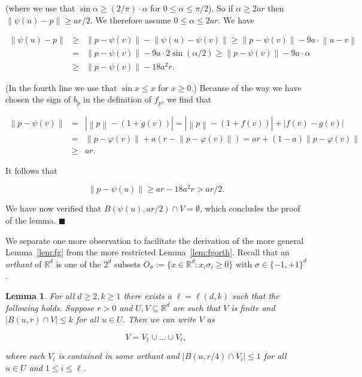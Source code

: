 \documentclass[11pt]{article}%
\newenvironment{proof}{\vspace{1ex}\noindent{\bf Proof.}}{\hspace*{\fill}$\blacksquare$\vspace{1ex}}
\newtheorem{lemma}[lemma]{Lemma}
\newcommand{\eR}[0]{\ensuremath{ \mathbb R}}
\newcommand{\norm}[1]{\ensuremath{\left\|#1\right\|}}
\begin{document}
\begin{proof}
\noindent
(where we use that $\sin\alpha \geq (2/\pi)\cdot\alpha$ for $0 \leq \alpha \leq \pi/2$).
So if $\alpha \geq 2ar$ then $\norm{\psi(u)-p} \geq ar/2$.
We therefore assume $0 \leq \alpha \leq 2ar$.
We have

$$ \begin{array}{rcl} 
\norm{\psi(u)-p} 
& \geq & 
\norm{p-\psi(v)} - \norm{\psi(u)-\psi(v)} 
\geq
\norm{p-\psi(v)} - 9a \cdot \norm{u-v} \\
& = & 
\norm{p-\psi(v)} - 9a \cdot 2\sin(\alpha/2) 
\geq
\norm{p-\psi(v)} - 9a \cdot \alpha \\
& \geq & 
\norm{p-\psi(v)} - 18 a^2 r. 
\end{array} $$

\noindent
(In the fourth line we use that $\sin x \leq x$ for $x \geq 0$.)
Because of the way we have chosen the sign of $b_p$ in the definition of $f_p$, we find that

$$ \begin{array}{rcl} 
\norm{p - \psi(v)} 
& = & |\norm{p}-(1+g(v))| = |\norm{p}-(1+f(v))|+|f(v)-g(v)| \\
& = & \norm{p-\varphi(v)} + a(r-\norm{p-\varphi(v)}) = ar + (1-a)\norm{p-\varphi(v)} \\
& \geq & ar. 
\end{array} $$

\noindent
It follows that 

$$ \norm{p - \psi(u)} \geq ar - 18 a^{2} r > ar/2. $$

\noindent
We have now verified that $B( \psi(u), ar/2 ) \cap V = \emptyset$, which concludes the 
proof of the lemma.
\end{proof}

We separate one more observation to facilitate the derivation of the more 
general Lemma~\ref{lem:fg} from the more restricted Lemma~\ref{lem:fgorth}.
Recall that an {\em orthant} of $\eR^d$ is one of the $2^d$ 
subsets $O_\sigma := \{ x \in \eR^d : x_i\sigma_i \geq 0 \}$ with $\sigma \in \{-1,+1\}^d$.

\begin{lemma}\label{lem:part}
For all $d\geq 2, k\geq 1$ there exists a $\ell = \ell(d,k)$ such that the following holds.
Suppose $r>0$ and $U, V \subseteq \eR^d$ are such that $V$ is finite and 
$|B(u,r) \cap V| \leq k$ for all $u \in U$.
Then we can write $V$ as 

$$ V = V_1 \cup \dots \cup V_\ell, $$

\noindent
where each $V_i$ is contained in some orthant and $|B(u,r/4) \cap V_i| \leq 1$ for all $u \in U$
and $1\leq i\leq\ell$.
\end{lemma}
\end{document}
